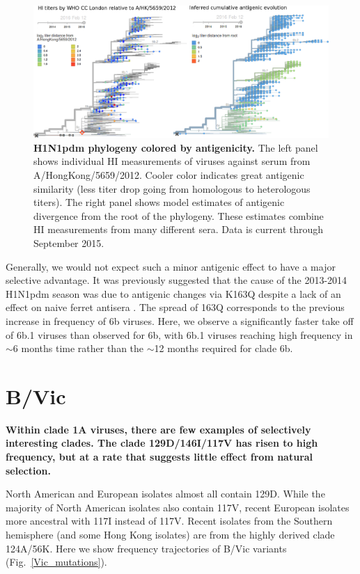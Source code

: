 \documentclass[11pt,oneside,letterpaper]{article}
\begin{document}
\begin{figure}[H]
	\centering		
	\includegraphics[width=1.0\textwidth]{../figures/feb-2016/H1N1pdm_HI.png}
	\caption{\textbf{H1N1pdm phylogeny colored by antigenicity.}
	The left panel shows individual HI measurements of viruses against serum from A/HongKong/5659/2012.
	Cooler color indicates great antigenic similarity (less titer drop going from homologous to heterologous titers).
	The right panel shows model estimates of antigenic divergence from the root of the phylogeny.
	These estimates combine HI measurements from many different sera.
	Data is current through September 2015.	
	}
	\label{H1N1pdm_HI}
\end{figure}

Generally, we would not expect such a minor antigenic effect to have a major selective advantage. It was previously suggested that the cause of the 2013-2014 H1N1pdm season was due to antigenic changes via K163Q despite a lack of an effect on naive ferret antisera \cite{linderman2014potential}. The spread of 163Q corresponds to the previous increase in frequency of 6b viruses. Here, we observe a significantly faster take off of 6b.1 viruses than observed for 6b, with 6b.1 viruses reaching high frequency in $\sim$6 months time rather than the $\sim$12 months required for clade 6b.

\clearpage
\pagebreak

\section*{B/Vic}

\textbf{Within clade 1A viruses, there are few examples of selectively interesting clades. The clade 129D/146I/117V has risen to high frequency, but at a rate that suggests little effect from natural selection.}

North American and European isolates almost all contain 129D. While the majority of North American isolates also contain 117V, recent European isolates more ancestral with 117I instead of 117V. Recent isolates from the Southern hemisphere (and some Hong Kong isolates) are from the highly derived clade 124A/56K. Here we show frequency trajectories of B/Vic variants (Fig.\ \ref{Vic_mutations}).
\end{document}
